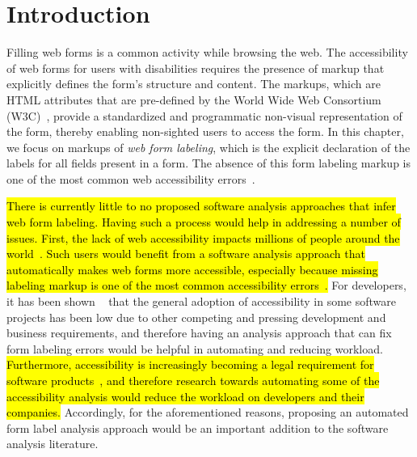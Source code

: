 \section{Introduction}

Filling web forms is a common activity while browsing the web. 
The accessibility of web forms for users with disabilities 
requires the presence of markup that explicitly defines the form's 
structure and content. The markups, which are HTML attributes that are 
pre-defined by the World Wide Web Consortium (W3C)~\cite{ARIA}, provide 
a standardized and programmatic non-visual representation of the form, 
thereby enabling non-sighted users to access the form. 
In this chapter, we focus on markups of \emph{web form labeling}, 
which is the explicit declaration of the labels for all fields present 
in a form. The absence of this form labeling markup is one of the 
most common web accessibility errors~\cite{webaim:1mil}.
\renewcommand{\toolname}{\textsc{AxeForm}\xspace}
 
\hl{There is currently little to no proposed software analysis 
approaches that infer web form labeling. Having such a process 
would help in addressing a number of issues. First, the lack of web 
accessibility impacts millions of people around the world~\mbox{\cite{stats:accessibility_population:US, stats:accessibility_population:EU}}. 
Such users would benefit from a software analysis approach that 
automatically makes web forms more accessible, especially because 
missing labeling markup is one of the most common accessibility 
errors~\mbox{\cite{webaim:1mil}}.} For developers, it has been shown
~\cite{vendome2019can,harper2012web} that the general adoption 
of accessibility in some software projects has been low due to 
other competing and pressing development and business requirements, 
and therefore having an analysis approach that can fix form 
labeling errors would be helpful in automating and reducing workload. 
\hl{Furthermore, accessibility is increasingly becoming a legal 
requirement for software products~\mbox{\cite{stats:accessibility_lawsuits:US_1, stats:accessibility_lawsuits:US_2}}, and therefore research towards 
automating some of the accessibility analysis would reduce the workload on developers and their companies. } 
Accordingly, for the aforementioned reasons, proposing an 
automated form label analysis approach would be an important 
addition to the software analysis literature. 


